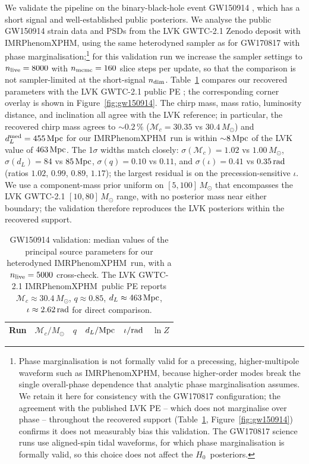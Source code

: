 \documentclass[usenatbib]{mnras}
\newcommand{\hzero}{\ensuremath{H_{0}}\xspace}
\newcommand{\XPHM}{IMRPhenomXPHM\xspace}
\begin{document}
We validate the pipeline on the binary-black-hole event GW150914 \citep{Abbott2016GW150914}, which has a short signal and well-established public posteriors. We analyse the public GW150914 strain data and PSDs from the LVK GWTC-2.1 Zenodo deposit \citep{GWTC2p1_GW150914_Zenodo} with \XPHM, using the same heterodyned sampler as for GW170817 with phase marginalisation;\footnote{\raggedright Phase marginalisation is not formally valid for a precessing, higher-multipole waveform such as \XPHM, because higher-order modes break the single overall-phase dependence that analytic phase marginalisation assumes. We retain it here for consistency with the GW170817 configuration; the agreement with the published LVK PE -- which does not marginalise over phase -- throughout the recovered support (Table~\ref{tab:gw150914}, Figure~\ref{fig:gw150914}) confirms it does not measurably bias this validation. The GW170817 science runs use aligned-spin tidal waveforms, for which phase marginalisation is formally valid, so this choice does not affect the \hzero\ posteriors.} for this validation run we increase the sampler settings to $n_{\rm live}=8000$ with $n_{\rm mcmc}=160$ slice steps per update, so that the comparison is not sampler-limited at the short-signal $n_{\rm dim}$. Table~\ref{tab:gw150914} compares our recovered parameters with the LVK GWTC-2.1 public PE \citep{Abbott2021GWTC2p1,GWTC2p1_GW150914_Zenodo}; the corresponding corner overlay is shown in Figure~\ref{fig:gw150914}. The chirp mass, mass ratio, luminosity distance, and inclination all agree with the LVK reference; in particular, the recovered chirp mass agrees to ${\sim}0.2\,\%$ ($\mathcal{M}_c=30.35$ vs $30.4\,M_\odot$) and $d_{L}^{\rm med}=455\,\rm Mpc$ for our \XPHM\ run is within ${\sim}8\,\rm Mpc$ of the LVK value of $463\,\rm Mpc$. The 1$\sigma$ widths match closely: $\sigma(\mathcal{M}_c)=1.02$ vs $1.00\,M_\odot$, $\sigma(d_L)=84$ vs $85\,\rm Mpc$, $\sigma(q)=0.10$ vs $0.11$, and $\sigma(\iota)=0.41$ vs $0.35\,\rm rad$ (ratios $1.02$, $0.99$, $0.89$, $1.17$); the largest residual is on the precession-sensitive $\iota$. We use a component-mass prior uniform on $[5,100]\,M_\odot$ that encompasses the LVK GWTC-2.1 $[10,80]\,M_\odot$ range, with no posterior mass near either boundary; the validation therefore reproduces the LVK posteriors within the recovered support.

\begin{table}
  \centering
  \caption{GW150914 validation: median values of the principal source parameters for our heterodyned \XPHM\ run, with a $n_{\rm live}=5000$ cross-check. The LVK GWTC-2.1 \XPHM\ public PE \citep{Abbott2021GWTC2p1,GWTC2p1_GW150914_Zenodo} reports $\mathcal{M}_c\approx 30.4\,M_\odot$, $q\approx 0.85$, $d_L\approx 463\,\rm Mpc$, $\iota\approx 2.62\,\rm rad$ for direct comparison.}
  \label{tab:gw150914}
  \begin{tabular}{lccccc}
    \toprule
    Run & $\mathcal{M}_{c}/M_{\odot}$ & $q$ & $d_{L}/\rm Mpc$ & $\iota/\rm rad$ & $\ln Z$ \\
    \midrule

  \end{tabular}
\end{table}
\end{document}
